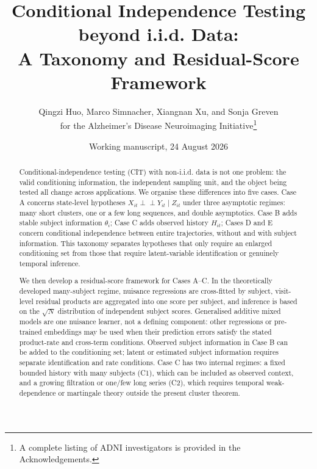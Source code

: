 \documentclass[11pt]{article}
\title{Conditional Independence Testing beyond i.i.d. Data:\\
A Taxonomy and Residual-Score Framework}
\author{Qingzi Huo, Marco Simnacher, Xiangnan Xu, and Sonja Greven\\
for the Alzheimer's Disease Neuroimaging Initiative\thanks{A complete listing of ADNI
investigators is provided in the Acknowledgements.}}
\date{Working manuscript, 24 August 2026}
\theoremstyle{definition}
\newcommand{\indep}{\perp\!\!\!\perp}
\begin{document}
\maketitle

\begin{abstract}
Conditional-independence testing (CIT) with non-i.i.d. data is not one problem: the valid
conditioning information, the independent sampling unit, and the object being tested all
change across applications. We organise these differences into five cases. Case A concerns
state-level hypotheses $X_{it}\indep Y_{it}\mid Z_{it}$ under three asymptotic regimes: many
short clusters, one or a few long sequences, and double asymptotics. Case B adds stable
subject information $\theta_i$; Case C adds observed history $H_{it}$; Cases D and E
concern conditional independence between entire trajectories, without and with subject
information. This taxonomy separates hypotheses that only require an enlarged conditioning
set from those that require latent-variable identification or genuinely temporal inference.

We then develop a residual-score framework for Cases A--C. In the theoretically developed
many-subject regime, nuisance regressions are cross-fitted by subject, visit-level residual
products are aggregated into one score per subject, and inference is based on the
$\sqrt N$ distribution of independent subject scores. Generalised additive mixed models are
one nuisance learner, not a defining component: other regressions or pre-trained embeddings
may be used when their prediction errors satisfy the stated product-rate and cross-term
conditions. Observed subject information in Case B can be added to the conditioning set;
latent or estimated subject information requires separate identification and rate
conditions. Case C has two internal regimes: a fixed bounded history with many subjects
(C1), which can be included as observed context, and a growing filtration or one/few long
series (C2), which requires temporal weak-dependence or martingale theory outside the present
cluster theorem.


\end{abstract}
\end{document}
